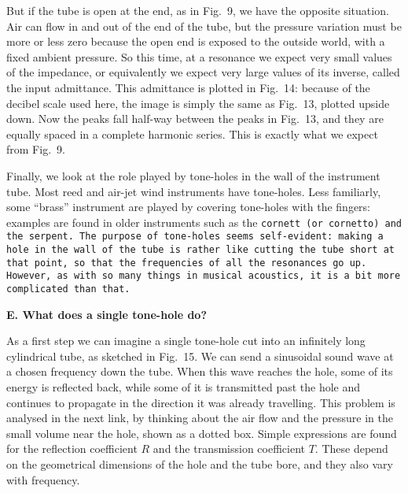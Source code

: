   But if the tube is open at the end, as in Fig.\ 9, we have the opposite 
  situation. Air can flow in and out of the end of the tube, but the pressure 
  variation must be more or less zero because the open end is exposed to the 
  outside world, with a fixed ambient pressure. So this time, at a resonance we 
  expect very small values of the impedance, or equivalently we expect very 
  large values of its inverse, called the input admittance. This admittance is 
  plotted in Fig.\ 14: because of the decibel scale used here, the image is 
  simply the same as Fig.\ 13, plotted upside down. Now the peaks fall half-way 
  between the peaks in Fig.\ 13, and they are equally spaced in a complete 
  harmonic series. This is exactly what we expect from Fig.\ 9. 


  Finally, we look at the role played by tone-holes in the wall of the 
  instrument tube. Most reed and air-jet wind instruments have tone-holes. Less 
  familiarly, some “brass” instrument are played by covering tone-holes with 
  the fingers: examples are found in older instruments such as the 
  \tt{}cornett\rm{} (or cornetto) and the \tt{}serpent\rm{}. The purpose of 
  tone-holes seems self-evident: making a hole in the wall of the tube is 
  rather like cutting the tube short at that point, so that the frequencies of 
  all the resonances go up. However, as with so many things in musical 
  acoustics, it is a bit more complicated than that. 

  \textbf{E. What does a single tone-hole do?} 

  As a first step we can imagine a single tone-hole cut into an infinitely long 
  cylindrical tube, as sketched in Fig.\ 15. We can send a sinusoidal sound 
  wave at a chosen frequency down the tube. When this wave reaches the hole, 
  some of its energy is reflected back, while some of it is transmitted past 
  the hole and continues to propagate in the direction it was already 
  travelling. This problem is analysed in the next link, by thinking about the 
  air flow and the pressure in the small volume near the hole, shown as a 
  dotted box. Simple expressions are found for the reflection coefficient $R$ 
  and the transmission coefficient $T$. These depend on the geometrical 
  dimensions of the hole and the tube bore, and they also vary with frequency. 

